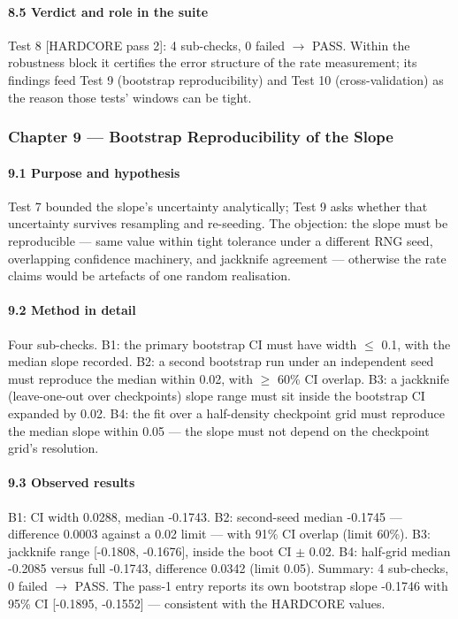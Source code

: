\documentclass[10pt]{article}
\begin{document}
\paragraph{8.5 Verdict and role in the suite}

Test 8 [HARDCORE pass 2]: 4 sub-checks, 0 failed $\rightarrow$ PASS. Within the robustness block it certifies the error structure of the rate measurement; its findings feed Test 9 (bootstrap reproducibility) and Test 10 (cross-validation) as the reason those tests' windows can be tight.

\subsubsection{Chapter 9 --- Bootstrap Reproducibility of the Slope}

\paragraph{9.1 Purpose and hypothesis}

Test 7 bounded the slope's uncertainty analytically; Test 9 asks whether that uncertainty survives resampling and re-seeding. The objection: the slope must be reproducible --- same value within tight tolerance under a different RNG seed, overlapping confidence machinery, and jackknife agreement --- otherwise the rate claims would be artefacts of one random realisation.

\paragraph{9.2 Method in detail}

Four sub-checks. B1: the primary bootstrap CI must have width $\le$ 0.1, with the median slope recorded. B2: a second bootstrap run under an independent seed must reproduce the median within 0.02, with $\ge$ 60\% CI overlap. B3: a jackknife (leave-one-out over checkpoints) slope range must sit inside the bootstrap CI expanded by 0.02. B4: the fit over a half-density checkpoint grid must reproduce the median slope within 0.05 --- the slope must not depend on the checkpoint grid's resolution.

\paragraph{9.3 Observed results}

B1: CI width 0.0288, median -0.1743. B2: second-seed median -0.1745 --- difference 0.0003 against a 0.02 limit --- with 91\% CI overlap (limit 60\%). B3: jackknife range [-0.1808, -0.1676], inside the boot CI $\pm$ 0.02. B4: half-grid median -0.2085 versus full -0.1743, difference 0.0342 (limit 0.05). Summary: 4 sub-checks, 0 failed $\rightarrow$ PASS. The pass-1 entry reports its own bootstrap slope -0.1746 with 95\% CI [-0.1895, -0.1552] --- consistent with the HARDCORE values.
\end{document}
